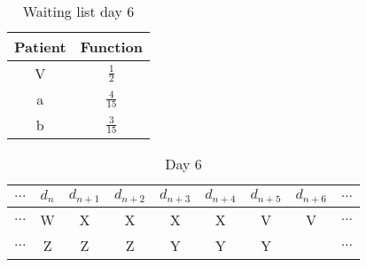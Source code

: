 \begin{table}
\centering
\begin{tabular}{|c|c|}
	\hline
	Patient & Function\\
	\hline
	V & $\frac{1}{2}$\\
	\hline
	a & $\frac{4}{15}$\\
	\hline
	b & $\frac{3}{15}$\\
	\hline
\end{tabular}
\caption{Waiting list day 6}
\end{table}

\begin{table}
\centering
\begin{tabular}{|c|c|c|c|c|c|c|c|c|}
	\multicolumn{1}{c}{$...$} & \multicolumn{1}{c}{$d_n$} & \multicolumn{1}{c}{$d_{n+1}$} & \multicolumn{1}{c}{$d_{n+2}$} & \multicolumn{1}{c}{$d_{n+3}$} & \multicolumn{1}{c}{$d_{n+4}$} & \multicolumn{1}{c}{$d_{n+5}$} & \multicolumn{1}{c}{$d_{n+6}$} & \multicolumn{1}{c}{$...$}\\
	\hline
	$...$ & W & X & X & X & X & V & V & $...$\\
	\hline
	$...$ & Z & Z & Z & Y & Y & Y &   & $...$\\
	\hline
\end{tabular}
\caption{Day 6}
\end{table}